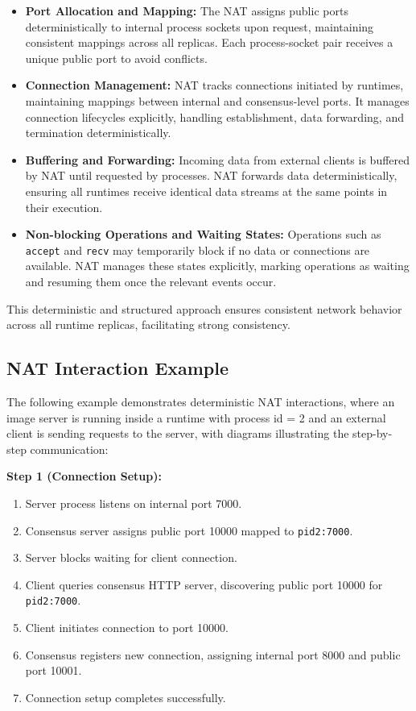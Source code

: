 \documentclass[10pt]{IEEEtran}
\begin{document}
\begin{itemize}
\item \textbf{Port Allocation and Mapping:} The NAT assigns public ports deterministically to internal process sockets upon request, maintaining consistent mappings across all replicas. Each process-socket pair receives a unique public port to avoid conflicts.
\item \textbf{Connection Management:} NAT tracks connections initiated by runtimes, maintaining mappings between internal and consensus-level ports. It manages connection lifecycles explicitly, handling establishment, data forwarding, and termination deterministically.
\item \textbf{Buffering and Forwarding:} Incoming data from external clients is buffered by NAT until requested by processes. NAT forwards data deterministically, ensuring all runtimes receive identical data streams at the same points in their execution.
\item \textbf{Non-blocking Operations and Waiting States:} Operations such as \texttt{accept} and \texttt{recv} may temporarily block if no data or connections are available. NAT manages these states explicitly, marking operations as waiting and resuming them once the relevant events occur.
\end{itemize}

This deterministic and structured approach ensures consistent network behavior across all runtime replicas, facilitating strong consistency.


\subsection{NAT Interaction Example}

The following example demonstrates deterministic NAT interactions, where an image server is running inside a runtime with process id = 2 and an external client is sending requests to the server, with diagrams illustrating the step-by-step communication:

\textbf{Step 1 (Connection Setup):}
\begin{enumerate}
\item Server process listens on internal port 7000.
\item Consensus server assigns public port 10000 mapped to \texttt{pid2:7000}.
\item Server blocks waiting for client connection.
\item Client queries consensus HTTP server, discovering public port 10000 for \texttt{pid2:7000}.
\item Client initiates connection to port 10000.
\item Consensus registers new connection, assigning internal port 8000 and public port 10001.
\item Connection setup completes successfully.
\end{enumerate}
\end{document}
